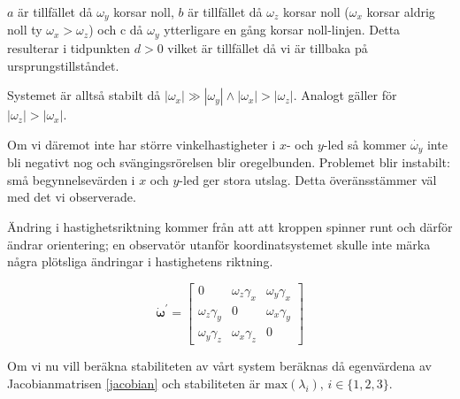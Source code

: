 \documentclass[12pt,a4paper]{article}
\begin{document}
		$a$ är tillfället då $\omega_y$ korsar noll, $b$ är tillfället då $\omega_z$ korsar
		noll ($\omega_x$ korsar aldrig noll ty $\omega_x > \omega_z$) och c då $\omega_y$
		ytterligare en gång korsar noll-linjen. Detta resulterar i tidpunkten $d>0$ vilket är
		tillfället då vi är tillbaka på ursprungstillståndet. 
		
		Systemet är alltså stabilt då $|\omega_x| \gg |\omega_y| \land |\omega_x| > |\omega_z|$.
		Analogt gäller för $|\omega_z| > |\omega_x|$.
		
		Om vi däremot inte har större
		vinkelhastigheter i $x$- och $y$-led så kommer $\dot{\omega_y}$ inte bli negativt
		nog och svängingsrörelsen blir oregelbunden. Problemet blir instabilt: små
		begynnelsevärden i $x$ och $y$-led ger stora utslag. Detta överänsstämmer väl med
		det vi observerade.
		
		Ändring i hastighetsriktning kommer från att att kroppen spinner runt och därför
		ändrar orientering; en observatör utanför koordinatsystemet skulle inte märka
		några plötsliga ändringar i hastighetens riktning.
		
		\begin{equation}
			\dot{\boldsymbol{\omega}}^{\prime} = \begin{bmatrix}
				0 & \omega_z \gamma_x & \omega_y \gamma_x \\
				\omega_z \gamma_y & 0 & \omega_x \gamma_y \\
				\omega_y \gamma_z & \omega_x \gamma_z & 0
			\end{bmatrix}
			\label{jacobian}
		\end{equation}
		
		Om vi nu vill beräkna stabiliteten av vårt system beräknas då egenvärdena av
		Jacobianmatrisen \eqref{jacobian} och stabiliteten är $\mathrm{max} (\lambda_i),\,i \in \{1,2,3\}$.
		
\end{document}
